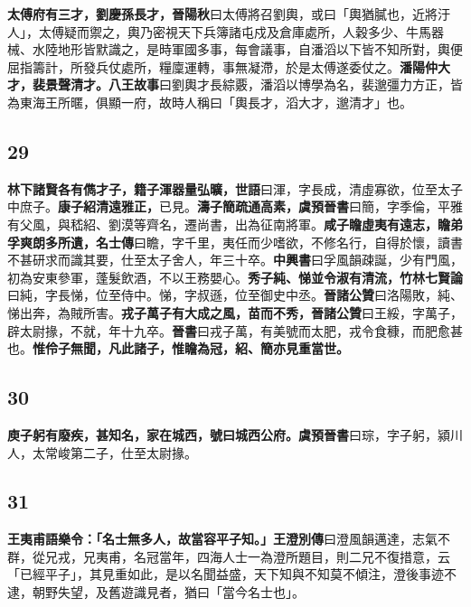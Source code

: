 \textbf{太傅府有三才，劉慶孫長才，}{\footnotesize \textbf{晉陽秋}曰太傅將召劉輿，或曰「輿猶膩也，近將汙人」，太傅疑而禦之，輿乃密視天下兵簿諸屯戍及倉庫處所，人穀多少、牛馬器械、水陸地形皆默識之，是時軍國多事，每會議事，自潘滔以下皆不知所對，輿便屈指籌計，所發兵仗處所，糧廩運轉，事無凝滯，於是太傅遂委仗之。}\textbf{潘陽仲大才，裴景聲清才。}{\footnotesize \textbf{八王故事}曰劉輿才長綜覈，潘滔以博學為名，裴邈彊力方正，皆為東海王所暱，俱顯一府，故時人稱曰「輿長才，滔大才，邈清才」也。}

\subsection*{29}

\textbf{林下諸賢各有儁才子，籍子渾器量弘曠，}{\footnotesize \textbf{世語}曰渾，字長成，清虛寡欲，位至太子中庶子。}\textbf{康子紹清遠雅正，}{\footnotesize 已見。}\textbf{濤子簡疏通高素，}{\footnotesize \textbf{虞預晉書}曰簡，字季倫，平雅有父風，與嵇紹、劉漠等齊名，遷尚書，出為征南將軍。}\textbf{咸子瞻虛夷有遠志，瞻弟孚爽朗多所遺，}{\footnotesize \textbf{名士傳}曰瞻，字千里，夷任而少嗜欲，不修名行，自得於懷，讀書不甚研求而識其要，仕至太子舍人，年三十卒。\textbf{中興書}曰孚風韻疎誕，少有門風，初為安東參軍，蓬髮飲酒，不以王務嬰心。}\textbf{秀子純、悌並令淑有清流，}{\footnotesize \textbf{竹林七賢論}曰純，字長悌，位至侍中。悌，字叔遜，位至御史中丞。\textbf{晉諸公贊}曰洛陽敗，純、悌出奔，為賊所害。}\textbf{戎子萬子有大成之風，苗而不秀，}{\footnotesize \textbf{晉諸公贊}曰王綏，字萬子，辟太尉掾，不就，年十九卒。\textbf{晉書}曰戎子萬，有美號而太肥，戎令食穅，而肥愈甚也。}\textbf{惟伶子無聞，凡此諸子，惟瞻為冠，紹、簡亦見重當世。}

\subsection*{30}

\textbf{庾子躬有廢疾，甚知名，家在城西，號曰城西公府。}{\footnotesize \textbf{虞預晉書}曰琮，字子躬，潁川人，太常峻第二子，仕至太尉掾。}

\subsection*{31}

\textbf{王夷甫語樂令：「名士無多人，故當容平子知。」}{\footnotesize \textbf{王澄別傳}曰澄風韻邁達，志氣不群，從兄戎，兄夷甫，名冠當年，四海人士一為澄所題目，則二兄不復措意，云「已經平子」，其見重如此，是以名聞益盛，天下知與不知莫不傾注，澄後事迹不逮，朝野失望，及舊遊識見者，猶曰「當今名士也」。}

